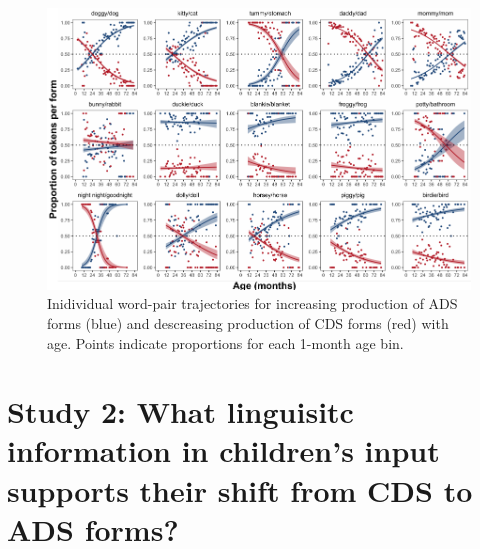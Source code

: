 \documentclass[10pt, letterpaper]{article}
\newenvironment{CodeChunk}{}{}
\begin{document}
\begin{CodeChunk}
\begin{figure}[!ht]

{\centering \includegraphics{figs/shift-timing-bypair-fig-1} 

}

\caption[Inidividual word-pair trajectories for increasing production of ADS forms (blue) and descreasing production of CDS forms (red) with age]{Inidividual word-pair trajectories for increasing production of ADS forms (blue) and descreasing production of CDS forms (red) with age. Points indicate proportions for each 1-month age bin.}\label{fig:shift-timing-bypair-fig}
\end{figure}
\end{CodeChunk}

\hypertarget{study-2-what-linguisitc-information-in-childrens-input-supports-their-shift-from-cds-to-ads-forms}{%
\section{Study 2: What linguisitc information in children's input
supports their shift from CDS to ADS
forms?}\label{study-2-what-linguisitc-information-in-childrens-input-supports-their-shift-from-cds-to-ads-forms}}
\end{document}
